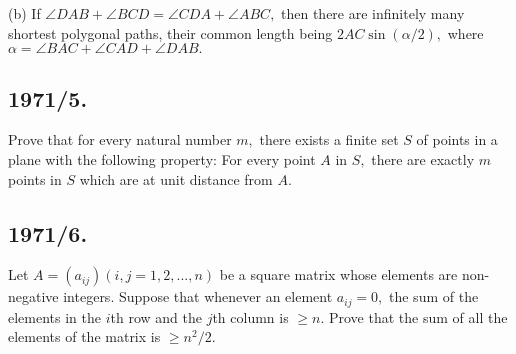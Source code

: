 \documentclass[12pt,thmsa]{article}
\begin{document}
(b) If $\angle DAB+\angle BCD=\angle CDA+\angle ABC,$ then there are
infinitely many shortest polygonal paths, their common length being $2AC\sin
(\alpha /2),$ where $\alpha =\angle BAC+\angle CAD+\angle DAB.$

\subsection{1971/5.}

Prove that for every natural number $m,$ there exists a finite set $S$ of
points in a plane with the following property: For every point $A$ in $S,$
there are exactly $m$ points in $S$ which are at unit distance from $A.$

\subsection{1971/6.}

Let $A=(a_{ij})(i,j=1,2,...,n)$ be a square matrix whose elements are
non-negative integers. Suppose that whenever an element $a_{ij}=0,$ the sum
of the elements in the $i$th row and the $j$th column is $\geq n$. Prove
that the sum of all the elements of the matrix is $\geq n^{2}/2.$
\end{document}
